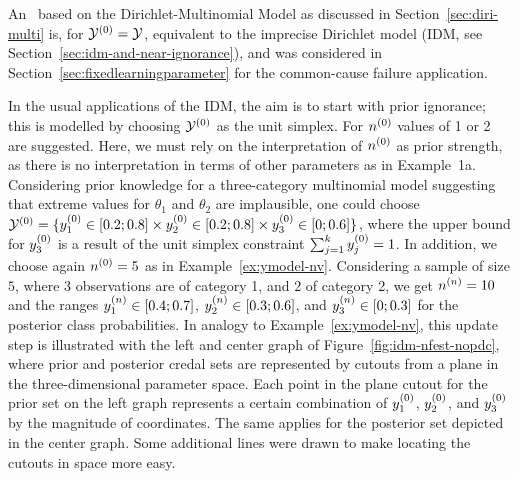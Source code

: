 \begin{example}
\label{ex:ymodel-idm}
An \ymodel\ based on the Dirichlet-Multinomial Model as discussed in Section~\ref{sec:diri-multi}
is, for $\mathcal{Y}^{(0)} = \mathcal{Y}$, equivalent to the imprecise Dirichlet model
(IDM, see Section~\ref{sec:idm-and-near-ignorance}), and was considered in Section~\ref{sec:fixedlearningparameter}
for the common-cause failure application.

In the usual applications of the IDM, the aim is to start with prior
ignorance; this is modelled by choosing $\mathcal{Y}^{(0)}$ as the unit
simplex. For $n^{(0)}$ values of 1 or 2 are suggested. Here,
we must rely on the interpretation of $n^{(0)}$ as prior strength, as
there is no interpretation in terms of other
parameters as in Example~1a.
%
%
Considering prior knowledge for a three-category multinomial model
suggesting that extreme values for $\theta_1$ and $\theta_2$ are
implausible, one could choose
$\mathcal{Y}^{(0)} = \{ y^{(0)}_1 \in [0.2;0.8] \times y^{(0)}_2 \in [0.2;0.8] \times y^{(0)}_3 \in [0;0.6]\}$,
where the upper bound for $y^{(0)}_3$ is a result of the unit
simplex constraint $\sum_{j=1}^k y^{(0)}_j = 1$.
In addition, we choose again $n^{(0)}=5$ as in Example~\ref{ex:ymodel-nv}.
%
%
Considering a sample of size $5$, where $3$ observations are of
category 1, and $2$ of category 2, we get $n^{(n)} = 10$ and the ranges
$y^{(n)}_1 \in [0.4 ; 0.7]$,
$y^{(n)}_2 \in [0.3 ; 0.6]$, and
$y^{(n)}_3 \in [0   ; 0.3]$
for the posterior class probabilities.
In analogy to Example~\ref{ex:ymodel-nv}, this update step is illustrated with the
left and center graph of Figure~\ref{fig:idm-nfest-nopdc}, where
prior and posterior credal sets are represented by cutouts from a
plane in the three-dimensional parameter space. Each point in the
plane cutout for the prior set on the left graph represents a
certain combination of $y^{(0)}_1$, $y^{(0)}_2$, and $y^{(0)}_3$ by the
magnitude of coordinates. The same applies for the posterior set
depicted in the center graph. Some additional lines were drawn to
make locating the cutouts in space more easy.
\end{example}

